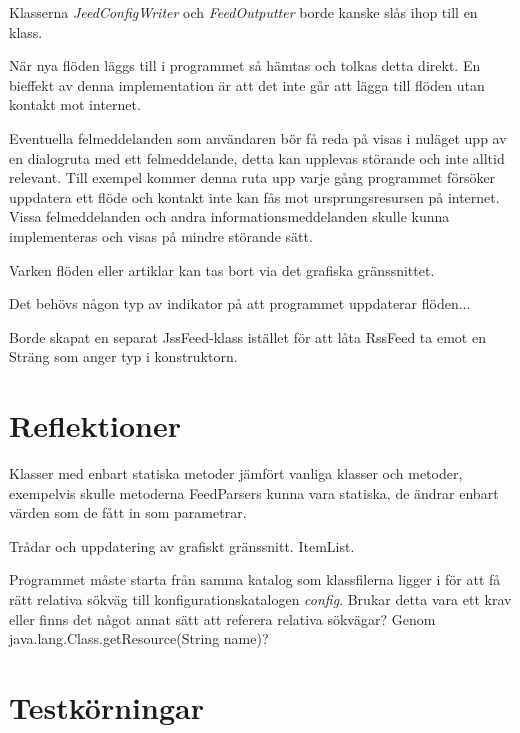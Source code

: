 \documentclass[titlepage, twoside, a4paper, 12pt]{article}
\begin{document}
Klasserna \textit{JeedConfigWriter} och \textit{FeedOutputter} borde
kanske slås ihop till en klass.

När nya flöden läggs till i programmet så hämtas och tolkas detta
direkt. En bieffekt av denna implementation är att det inte går att
lägga till flöden utan kontakt mot internet.

Eventuella felmeddelanden som användaren bör få reda på visas i
nuläget upp av en dialogruta med ett felmeddelande, detta kan upplevas
störande och inte alltid relevant. Till exempel kommer denna ruta upp
varje gång programmet försöker uppdatera ett flöde och kontakt inte
kan fås mot ursprungsresursen på internet. Vissa felmeddelanden och
andra informationsmeddelanden skulle kunna implementeras och visas på
mindre störande sätt.

Varken flöden eller artiklar kan tas bort via det grafiska
gränssnittet.

Det behövs någon typ av indikator på att programmet uppdaterar
flöden...

Borde skapat en separat JssFeed-klass istället för att låta RssFeed ta
emot en Sträng som anger typ i konstruktorn.

\section{Reflektioner}\label{Reflektioner}

Klasser med enbart statiska metoder jämfört vanliga klasser och
metoder, exempelvis skulle metoderna FeedParsers kunna vara statiska,
de ändrar enbart värden som de fått in som parametrar.

Trådar och uppdatering av grafiskt gränssnitt. ItemList.

Programmet måste starta från samma katalog som klassfilerna ligger i
för att få rätt relativa sökväg till konfigurationskatalogen
\textit{config}. Brukar detta vara ett krav eller finns det något
annat sätt att referera relativa sökvägar? Genom
java.lang.Class.getResource(String name)?

\section{Testkörningar}\label{Testkorningar}
\end{document}
